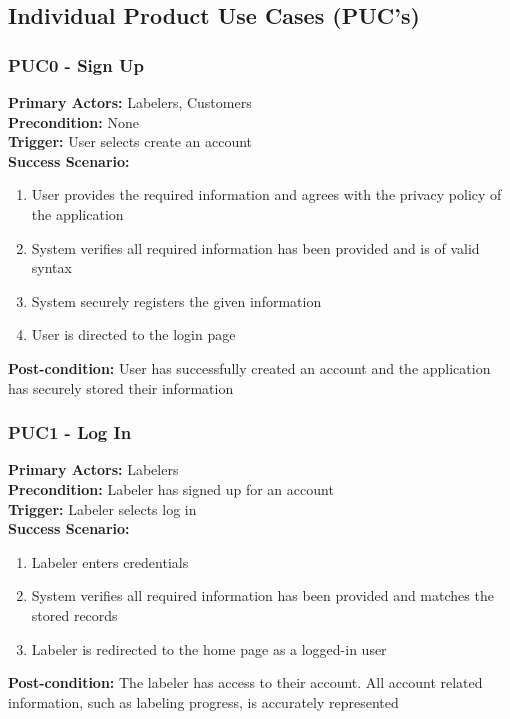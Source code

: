 \documentclass[12pt]{article}
\begin{document}
\subsection{Individual Product Use Cases (PUC's)}
\subsubsection*{PUC0 - Sign Up}
\label{sec:PUC0}
\textbf{Primary Actors:} Labelers, Customers\\ 
\textbf{Precondition:} None\\
\textbf{Trigger:} User selects create an account\\
\textbf{Success Scenario:}
\begin{enumerate}
    \item User provides the required information and agrees with the privacy policy of the application
    \item System verifies all required information has been provided and is of valid syntax
    \item System securely registers the given information
    \item User is directed to the login page
\end{enumerate}
\textbf{Post-condition:} User has successfully created an account and the application has securely stored their information

\subsubsection*{PUC1 - Log In}
\label{sec:PUC1}
\textbf{Primary Actors:} Labelers\\ 
\textbf{Precondition:} Labeler has signed up for an account\\
\textbf{Trigger:} Labeler selects log in\\
\textbf{Success Scenario:}
\begin{enumerate}
    \item Labeler enters credentials
    \item System verifies all required information has been provided and matches the stored records
    \item Labeler is redirected to the home page as a logged-in user
\end{enumerate}
\textbf{Post-condition:} The labeler has access to their account. All account related information, such as labeling progress, is accurately represented
\end{document}

